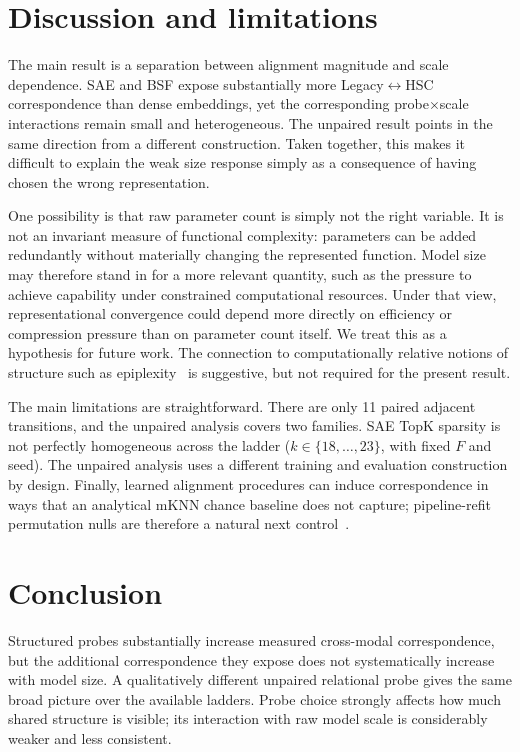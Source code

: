 \documentclass[11pt]{article}
\begin{document}
\section{Discussion and limitations}
\label{sec:disc}

The main result is a separation between alignment magnitude and scale dependence.
SAE and BSF expose substantially more Legacy\(\leftrightarrow\)HSC correspondence than dense embeddings, yet the corresponding probe\(\times\)scale interactions remain small and heterogeneous.
The unpaired result points in the same direction from a different construction.
Taken together, this makes it difficult to explain the weak size response simply as a consequence of having chosen the wrong representation.

One possibility is that raw parameter count is simply not the right variable.
It is not an invariant measure of functional complexity: parameters can be added redundantly without materially changing the represented function.
Model size may therefore stand in for a more relevant quantity, such as the pressure to achieve capability under constrained computational resources.
Under that view, representational convergence could depend more directly on efficiency or compression pressure than on parameter count itself.
We treat this as a hypothesis for future work.
The connection to computationally relative notions of structure such as epiplexity~\citep{finzi2026epiplexity} is suggestive, but not required for the present result.

The main limitations are straightforward.
There are only 11 paired adjacent transitions, and the unpaired analysis covers two families.
SAE TopK sparsity is not perfectly homogeneous across the ladder (\(k\in\{18,\ldots,23\}\), with fixed \(F\) and seed).
The unpaired analysis uses a different training and evaluation construction by design.
Finally, learned alignment procedures can induce correspondence in ways that an analytical mKNN chance baseline does not capture; pipeline-refit permutation nulls are therefore a natural next control~\citep{groger2026aristotelian}.

\section{Conclusion}
\label{sec:conc}

Structured probes substantially increase measured cross-modal correspondence, but the additional correspondence they expose does not systematically increase with model size.
A qualitatively different unpaired relational probe gives the same broad picture over the available ladders.
Probe choice strongly affects how much shared structure is visible; its interaction with raw model scale is considerably weaker and less consistent.
\end{document}
